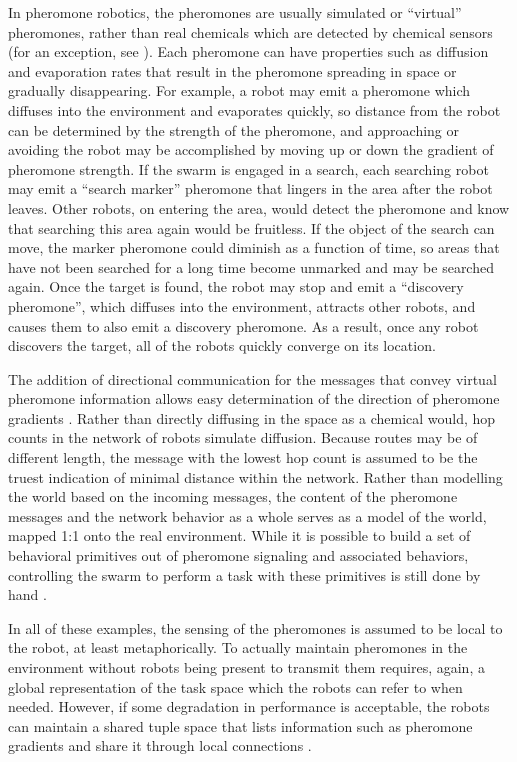 In pheromone robotics, the pheromones are usually simulated or ``virtual'' pheromones, rather than real chemicals which are detected by chemical sensors (for an exception, see \citep{hayes2001swarm}). 
Each pheromone can have properties such as diffusion and evaporation rates that result in the pheromone spreading in space or gradually disappearing. 
For example, a robot may emit a pheromone which diffuses into the environment and evaporates quickly, so distance from the robot can be determined by the strength of the pheromone, and approaching or avoiding the robot may be accomplished by moving up or down the gradient of pheromone strength. 
If the swarm is engaged in a search, each searching robot may emit a ``search marker'' pheromone that lingers in the area after the robot leaves. 
Other robots, on entering the area, would detect the pheromone and know that searching this area again would be fruitless. 
If the object of the search can move, the marker pheromone could diminish as a function of time, so areas that have not been searched for a long time become unmarked and may be searched again. 
Once the target is found, the robot may stop and emit a ``discovery pheromone'', which diffuses into the environment, attracts other robots, and causes them to also emit a discovery pheromone. 
As a result, once any robot discovers the target, all of the robots quickly converge on its location. 

The addition of directional communication for the messages that convey virtual pheromone information allows easy determination of the direction of pheromone gradients \citep{payton2001pheromone}.
Rather than directly diffusing in the space as a chemical would, hop counts in the network of robots simulate diffusion. 
Because routes may be of different length, the message with the lowest hop count is assumed to be the truest indication of minimal distance within the network. 
Rather than modelling the world based on the incoming messages, the content of the pheromone messages and the network behavior as a whole serves as a model of the world, mapped 1:1 onto the real environment. 
While it is possible to build a set of behavioral primitives out of pheromone signaling and associated behaviors, controlling the swarm to perform a task with these primitives is still done by hand \citep{payton2003compound}.

In all of these examples, the sensing of the pheromones is assumed to be local to the robot, at least metaphorically. 
To actually maintain pheromones in the environment without robots being present to transmit them requires, again, a global representation of the task space which the robots can refer to when needed. 
However, if some degradation in performance is acceptable, the robots can maintain a shared tuple space that lists information such as pheromone gradients and share it through local connections \citep{pinciroli2016tuple}. 

